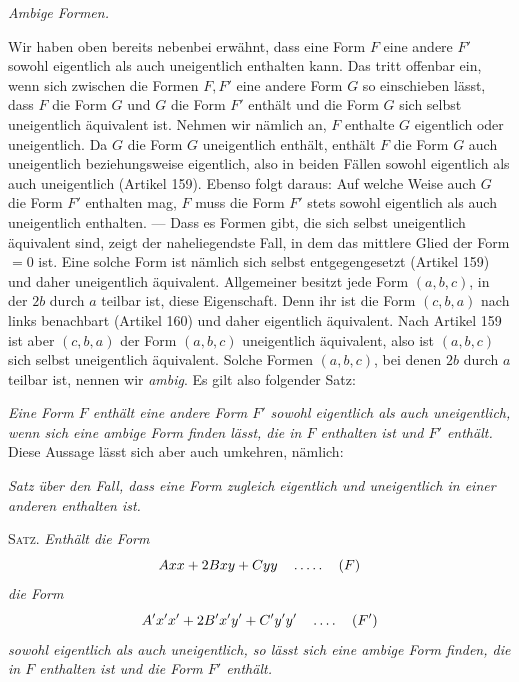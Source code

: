 \begin{center}
\textit{Ambige Formen.}
\end{center}
Wir haben oben bereits nebenbei erwähnt, dass eine Form $F$ eine andere $F'$ sowohl eigentlich als auch uneigentlich enthalten kann. Das tritt offenbar ein, wenn sich zwischen die Formen $F,F'$ eine andere Form $G$ so einschieben lässt, dass $F$ die Form $G$ und $G$ die Form $F'$ enthält und die Form $G$ sich selbst uneigentlich äquivalent ist. Nehmen wir nämlich an, $F$ enthalte $G$ eigentlich oder uneigentlich. Da $G$ die Form $G$ uneigentlich enthält, enthält $F$ die Form $G$ auch uneigentlich beziehungsweise eigentlich, also in beiden Fällen sowohl eigentlich als auch uneigentlich (Artikel 159). Ebenso folgt daraus: Auf welche Weise auch $G$ die Form $F'$ enthalten mag, $F$ muss die Form $F'$ stets sowohl eigentlich als auch uneigentlich enthalten. --- Dass es Formen gibt, die sich selbst uneigentlich äquivalent sind, zeigt der naheliegendste Fall, in dem das mittlere Glied der Form $=0$ ist. Eine solche Form ist nämlich sich selbst entgegengesetzt (Artikel 159) und daher uneigentlich äquivalent. Allgemeiner besitzt jede Form $(a,b,c)$, in der $2b$ durch $a$ teilbar ist, diese Eigenschaft. Denn ihr ist die Form $(c,b,a)$ nach links benachbart (Artikel 160) und daher eigentlich äquivalent. Nach Artikel 159 ist aber $(c,b,a)$ der Form $(a,b,c)$ uneigentlich äquivalent, also ist $(a,b,c)$ sich selbst uneigentlich äquivalent. Solche Formen $(a,b,c)$, bei denen $2b$ durch $a$ teilbar ist, nennen wir \textit{ambig}. Es gilt also folgender Satz:

\textit{Eine Form $F$ enthält eine andere Form $F'$ sowohl eigentlich als auch uneigentlich, wenn sich eine ambige Form finden lässt, die in $F$ enthalten ist und $F'$ enthält.} Diese Aussage lässt sich aber auch umkehren, nämlich:

\begin{center}
\textit{Satz über den Fall, dass eine Form zugleich eigentlich und uneigentlich in einer anderen enthalten ist.}
\end{center}
\textsc{Satz.} \textit{Enthält die Form}
\[
Axx+2Bxy+Cyy\quad\mathinner{.\,.\,.\,.\,.}\quad(F)
\]
\textit{die Form}
\[
A'x'x'+2B'x'y'+C'y'y'\quad\mathinner{.\,.\,.\,.}\quad(F')
\]
\textit{sowohl eigentlich als auch uneigentlich, so lässt sich eine ambige Form finden, die in $F$ enthalten ist und die Form $F'$ enthält.}

